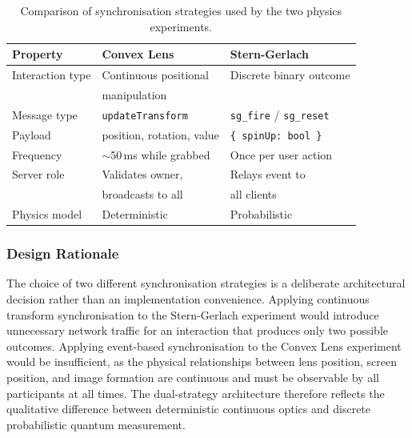 \begin{table}[htbp]
\centering
\caption{Comparison of synchronisation strategies used by the two 
physics experiments.}
\label{tab:sync_strategies}
\begin{tabular}{lll}
\toprule
\textbf{Property} & \textbf{Convex Lens} & \textbf{Stern-Gerlach} \\
\midrule
Interaction type   & Continuous positional      & Discrete binary outcome \\
                   & manipulation               &                         \\
Message type       & \texttt{updateTransform}   & \texttt{sg\_fire} / \texttt{sg\_reset} \\
Payload            & position, rotation, value  & \texttt{\{\ spinUp: bool\ \}} \\
Frequency          & $\sim$50\,ms while grabbed & Once per user action \\
Server role        & Validates owner,           & Relays event to          \\
                   & broadcasts to all          & all clients              \\
Physics model      & Deterministic              & Probabilistic \\
\bottomrule
\end{tabular}
\end{table}



\subsubsection{Design Rationale}

The choice of two different synchronisation strategies is a deliberate
architectural decision rather than an implementation convenience. Applying
continuous transform synchronisation to the Stern-Gerlach experiment
would introduce unnecessary network traffic for an interaction that
produces only two possible outcomes. Applying event-based synchronisation
to the Convex Lens experiment would be insufficient, as the physical
relationships between lens position, screen position, and image formation
are continuous and must be observable by all participants at all times.
The dual-strategy architecture therefore reflects the qualitative
difference between deterministic continuous optics and discrete
probabilistic quantum measurement. 

